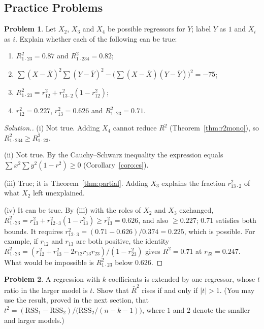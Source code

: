 \documentclass[11pt,a4paper]{article}
\numberwithin{equation}{section}
\theoremstyle{definition}
\newtheorem{problemx}{Problem}[subsection]
\newenvironment{problem}{\begin{problemx}}{\end{problemx}}
\newenvironment{solution}
  {\renewcommand{\qedsymbol}{}\begin{proof}[\textit{Solution}.]}
  {\end{proof}}
\begin{document}
\subsection{Practice Problems}

\begin{problem}
Let $X_2$, $X_3$ and $X_4$ be possible regressors for $Y$; label $Y$ as $1$ and $X_i$ as $i$. Explain whether each of the following can be true:
\begin{enumerate}[label=(\roman*)]
\item $R^2_{1\cdot23} = 0.87$ and $R^2_{1\cdot234} = 0.82$;
\item $\sum (X - \bar X)^2\sum (Y - \bar Y)^2 - \bigl(\sum (X - \bar X)(Y - \bar Y)\bigr)^2 = -75$;
\item $R^2_{1\cdot23} = r_{12}^2 + r_{13\cdot2}^2(1 - r_{12}^2)$;
\item $r_{12}^2 = 0.227$, $r_{13}^2 = 0.626$ and $R^2_{1\cdot23} = 0.71$.
\end{enumerate}
\end{problem}

\begin{solution}
(i) Not true. Adding $X_4$ cannot reduce $R^2$ (Theorem~\ref{thm:r2mono}), so $R^2_{1\cdot234} \geq R^2_{1\cdot23}$.

(ii) Not true. By the Cauchy--Schwarz inequality the expression equals $\sum x^2\sum y^2(1 - r^2) \geq 0$ (Corollary~\ref{coro:cs}).

(iii) True; it is Theorem~\ref{thm:partial}. Adding $X_3$ explains the fraction $r_{13\cdot2}^2$ of what $X_2$ left unexplained.

(iv) It can be true. By (iii) with the roles of $X_2$ and $X_3$ exchanged, $R^2_{1\cdot23} = r_{13}^2 + r_{12\cdot3}^2(1 - r_{13}^2) \geq r_{13}^2 = 0.626$, and also
$\geq 0.227$; $0.71$ satisfies both bounds. It requires $r_{12\cdot3}^2 = (0.71 - 0.626)/0.374 = 0.225$, which is possible. For example, if $r_{12}$ and $r_{13}$
are both positive, the identity $R^2_{1\cdot23} = (r_{12}^2 + r_{13}^2 - 2r_{12}r_{13}r_{23})/(1 - r_{23}^2)$ gives $R^2 = 0.71$ at $r_{23} = 0.247$. What would be
impossible is $R^2_{1\cdot23}$ below $0.626$.
\end{solution}

\begin{problem}
\label{prob:adjr2}
A regression with $k$ coefficients is extended by one regressor, whose $t$ ratio in the larger model is $t$. Show that $\bar R^2$ rises if and only if
$|t| > 1$. (You may use the result, proved in the next section, that $t^2 = (\text{RSS}_1 - \text{RSS}_2)/\bigl(\text{RSS}_2/(n - k - 1)\bigr)$, where $1$ and $2$
denote the smaller and larger models.)
\end{problem}
\end{document}
